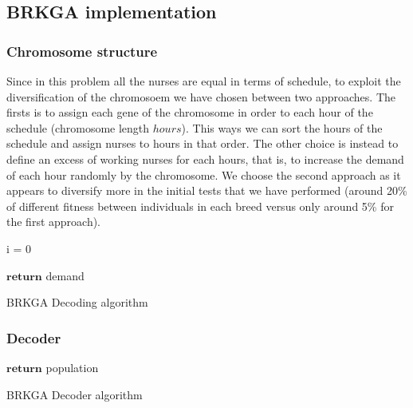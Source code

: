 \subsection{BRKGA implementation}

\subsubsection{Chromosome structure}

Since in this problem all the nurses are equal in terms of schedule, to exploit the diversification of the chromosoem we have chosen between two approaches. The firsts is to assign each gene of the chromosome in order to each hour of the schedule (chromosome length $hours$). This ways we can sort the hours of the schedule and assign nurses to hours in that order. The other choice is instead to define an excess of working nurses for each hours, that is, to increase the demand of each hour randomly by the chromosome. We choose the second approach as it appears to diversify more in the initial tests that we have performed (around 20\% of different fitness between individuals in each breed versus only around 5\% for the first approach).


\begin{algorithm}[H]


i = 0 \\

$\textbf{return}$ demand
\caption{BRKGA Decoding algorithm}\label{brkga.decoding}
\end{algorithm}


\subsubsection{Decoder}


\begin{algorithm}[H]


$\textbf{return}$ population
\caption{BRKGA Decoder algorithm}\label{BRKGA.decoder.mainLoop}
\end{algorithm}

